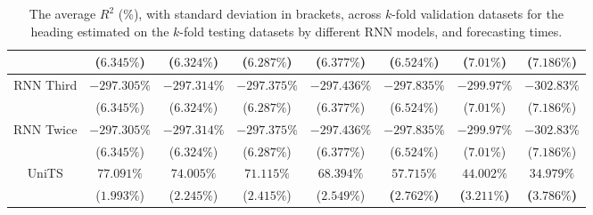 \begin{table}[!ht]
{\begin{tabular}{|c|c|c|c|c|c|c|c|}
			 & ($6.345\%$) & ($6.324\%$) & ($6.287\%$) & ($6.377\%$) & ($6.524\%$) & ($7.01\%$) & ($7.186\%$) \\ \hline
			\multirow{2}{*}{RNN Third} & $-297.305\%$ & $-297.314\%$ & $-297.375\%$ & $-297.436\%$ & $-297.835\%$ & $-299.97\%$ & $-302.83\%$ \\
			 & ($6.345\%$) & ($6.324\%$) & ($6.287\%$) & ($6.377\%$) & ($6.524\%$) & ($7.01\%$) & ($7.186\%$) \\ \hline
			\multirow{2}{*}{RNN Twice} & $-297.305\%$ & $-297.314\%$ & $-297.375\%$ & $-297.436\%$ & $-297.835\%$ & $-299.97\%$ & $-302.83\%$ \\
			 & ($6.345\%$) & ($6.324\%$) & ($6.287\%$) & ($6.377\%$) & ($6.524\%$) & ($7.01\%$) & ($7.186\%$) \\ \hline
			\multirow{2}{*}{UniTS} & $77.091\%$ & $74.005\%$ & $71.115\%$ & $68.394\%$ & $\mathbf{57.715\%}$ & $\mathbf{44.002\%}$ & $\mathbf{34.979\%}$ \\
			 & ($1.993\%$) & ($2.245\%$) & ($2.415\%$) & ($2.549\%$) & \textbf{(}$\mathbf{2.762\%}$\textbf{)} & \textbf{(}$\mathbf{3.211\%}$\textbf{)} & \textbf{(}$\mathbf{3.786\%}$\textbf{)} \\ \hline
		\end{tabular}
	}
	\caption{The average $R^{2}$ (\%), with standard deviation in brackets, across $k$-fold validation datasets for the heading estimated on the $k$-fold testing datasets by different RNN models, and forecasting times.}
	\label{tab:all_direction_R2}
\end{table}